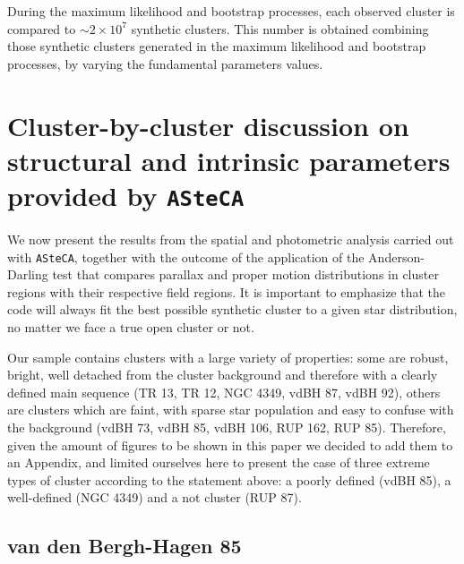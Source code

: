 \documentclass[draft]{aa}
\begin{document}
During the maximum likelihood and bootstrap processes,
each observed cluster is compared to $\sim2\times10^7$
synthetic clusters. This number is obtained combining those synthetic
clusters generated in the maximum likelihood and bootstrap processes, by
varying the fundamental parameters values.




\section{Cluster-by-cluster discussion on structural and intrinsic parameters
provided by \texttt{ASteCA}}
\label{sec:cluster_discuss}

We now present the results from the spatial and photometric analysis
carried out with \texttt{ASteCA}, together with the outcome of the application
of the Anderson-Darling test that compares parallax and proper motion
distributions in cluster regions with their respective field regions.
It is important to emphasize that the code will always fit the
best possible synthetic cluster to a given star distribution, no matter we
face a true open cluster or not.

Our sample contains clusters with a large variety of properties: some are
robust, bright, well detached from the cluster background and therefore with a
clearly defined main sequence (TR 13, TR 12, NGC 4349, vdBH 87, vdBH 92),
others are clusters which are faint, with sparse star population and easy to
confuse with the background (vdBH 73, vdBH 85, vdBH 106, RUP 162, RUP 85).
Therefore, given the amount of figures to be shown in this paper we decided to
add them to an Appendix, and limited ourselves here to present
the case of three extreme types of cluster according to the statement
above: a poorly defined (vdBH 85), a well-defined (NGC 4349) and a not
cluster (RUP 87).






\subsection{van den Bergh-Hagen 85}
\label{ssec:vdbh85}
\end{document}
